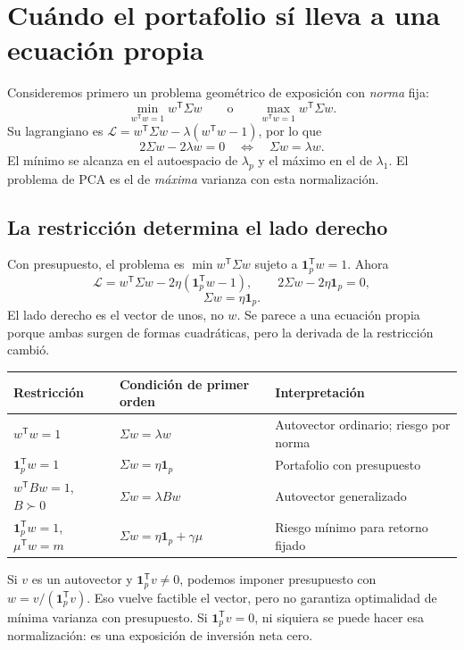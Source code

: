 \documentclass[11pt,a4paper]{article}
\newcommand{\T}{^{\mathsf T}}
\newcommand{\ones}{\mathbf 1}
\theoremstyle{definition}
\begin{document}
\section{Cuándo el portafolio sí lleva a una ecuación propia}
Consideremos primero un problema geométrico de exposición con \emph{norma} fija:
\[
\min_{w\T w=1}w\T\Sigma w\qquad\text{o}\qquad
\max_{w\T w=1}w\T\Sigma w.
\]
Su lagrangiano es $\mathcal L=w\T\Sigma w-\lambda(w\T w-1)$, por lo que
\[
2\Sigma w-2\lambda w=0\quad\Longleftrightarrow\quad
\boxed{\Sigma w=\lambda w}.
\]
El mínimo se alcanza en el autoespacio de $\lambda_p$ y el máximo en el de $\lambda_1$. El problema de PCA es el de \emph{máxima} varianza con esta normalización.
\subsection{La restricción determina el lado derecho}
Con presupuesto, el problema es $\min w\T\Sigma w$ sujeto a $\ones_p\T w=1$. Ahora
\[
\mathcal L=w\T\Sigma w-2\eta(\ones_p\T w-1),\qquad
2\Sigma w-2\eta\ones_p=0,
\]
\[
\boxed{\Sigma w=\eta\ones_p}.
\]
El lado derecho es el vector de unos, no $w$. Se parece a una ecuación propia porque ambas surgen de formas cuadráticas, pero la derivada de la restricción cambió.
\begin{center}\small
\begin{tabular}{>{\raggedright\arraybackslash}p{4.2cm}>{\raggedright\arraybackslash}p{5.2cm}>{\raggedright\arraybackslash}p{5.6cm}}\toprule
Restricción & Condición de primer orden & Interpretación\\\midrule
$w\T w=1$ & $\Sigma w=\lambda w$ & Autovector ordinario; riesgo por norma\\
$\ones_p\T w=1$ & $\Sigma w=\eta\ones_p$ & Portafolio con presupuesto\\
$w\T Bw=1$, $B\succ0$ & $\Sigma w=\lambda Bw$ & Autovector generalizado\\
$\ones_p\T w=1$, $\mu\T w=m$ & $\Sigma w=\eta\ones_p+\gamma\mu$ & Riesgo mínimo para retorno fijado\\\bottomrule
\end{tabular}\end{center}
\begin{cuidado}
Si $v$ es un autovector y $\ones_p\T v\ne0$, podemos imponer presupuesto con $w=v/(\ones_p\T v)$. Eso vuelve factible el vector, pero no garantiza optimalidad de mínima varianza con presupuesto. Si $\ones_p\T v=0$, ni siquiera se puede hacer esa normalización: es una exposición de inversión neta cero.
\end{cuidado}
\end{document}
